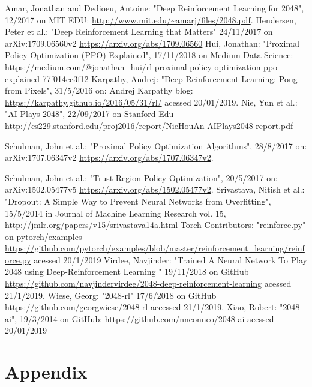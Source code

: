 \documentclass[11pt, fleqn]{article}
\begin{document}
\begin{thebibliography}{9}
Amar, Jonathan and Dedioeu, Antoine: "Deep Reinforcement Learning for 2048", 12/2017 on MIT EDU: \url{http://www.mit.edu/~amarj/files/2048.pdf}.
Hendersen, Peter et al.: "Deep Reinforcement Learning that Matters" 24/11/2017 on arXiv:1709.06560v2 \url{https://arxiv.org/abs/1709.06560}
Hui, Jonathan: "Proximal Policy Optimization (PPO) Explained", 17/11/2018 on Medium Data Science: \url{https://medium.com/@jonathan_hui/rl-proximal-policy-optimization-ppo-explained-77f014ec3f12}
Karpathy, Andrej: "Deep Reinforcement Learning: Pong from Pixels", 31/5/2016 on: Andrej Karpathy blog: \url{https://karpathy.github.io/2016/05/31/rl/} acessed 20/01/2019.
Nie, Yun et al.: "AI Plays 2048", 22/09/2017 on Stanford Edu \url{http://cs229.stanford.edu/proj2016/report/NieHouAn-AIPlays2048-report.pdf}

Schulman, John et al.: "Proximal Policy Optimization Algorithms", 28/8/2017 on:  arXiv:1707.06347v2 \url{https://arxiv.org/abs/1707.06347v2}.

Schulman, John et al.: "Trust Region Policy Optimization", 20/5/2017 on:  arXiv:1502.05477v5 \url{https://arxiv.org/abs/1502.05477v2}.
Srivastava, Nitish et al.: "Dropout: A Simple Way to Prevent Neural Networks from Overfitting", 15/5/2014 in Journal of Machine Learning Research vol. 15, \url{http://jmlr.org/papers/v15/srivastava14a.html}
Torch Contributors: "reinforce.py" on pytorch/examples \url{https://github.com/pytorch/examples/blob/master/reinforcement_learning/reinforce.py} acessed 20/1/2019
Virdee, Navjinder: "Trained A Neural Network To Play 2048 using Deep-Reinforcement Learning " 19/11/2018 on GitHub \url{https://github.com/navjindervirdee/2048-deep-reinforcement-learning} acessed 21/1/2019.
Wiese, Georg: "2048-rl" 17/6/2018 on GitHub \url{https://github.com/georgwiese/2048-rl} accessed 21/1/2019.
Xiao, Robert: "2048-ai", 19/3/2014 on GitHub: \url{https://github.com/nneonneo/2048-ai} acessed 20/01/2019
\end{thebibliography}



\section{Appendix}
\end{document}
